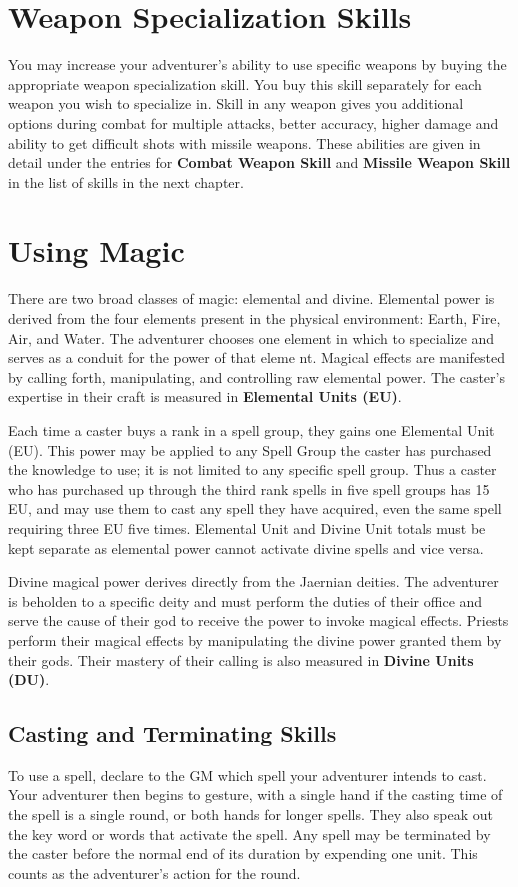 \setlength{\columnsep}{\defcolwidth}
\begin{multicols*}{2}
\section{Weapon Specialization Skills}
You may increase your adventurer’s ability to use
specific weapons by buying the appropriate weapon specialization skill. You buy this skill separately for each weapon you wish to specialize in. Skill in any weapon gives you additional options during combat for multiple attacks, better accuracy, higher damage and ability to get difficult shots with missile weapons. These abilities are given in detail under the entries for \textbf{Combat Weapon Skill} and \textbf{Missile
Weapon Skill} in the list of skills in the next chapter.
\section{Using Magic}
There are two broad classes of magic: elemental
and divine. Elemental power is derived from the four elements present in the physical environment: Earth, Fire, Air, and Water. The adventurer chooses one element in which to specialize and serves as a conduit for the power of that eleme nt. Magical effects are manifested by calling forth, manipulating, and controlling raw elemental power. The caster’s expertise in their craft is measured in \textbf{Elemental Units (EU)}.

Each time a caster buys a rank in a spell group, they gains one Elemental Unit (EU). This power may be applied to any Spell Group the caster has purchased the knowledge to use; it is not limited to any specific spell group. Thus a caster who has purchased up through the third rank spells in five spell groups has 15 EU, and may use them to cast any spell they have acquired, even the same spell requiring three EU five times. Elemental Unit and Divine Unit totals must be kept separate as elemental power cannot activate divine spells and vice versa.

Divine magical power derives directly from the Jaernian deities. The adventurer is beholden to a specific deity and must perform the duties of their office and serve the cause of their god to receive the power to invoke magical effects. Priests perform their magical effects by manipulating the divine power granted them by their gods. Their mastery of their calling is also measured in \textbf{Divine Units (DU)}.
\subsection{Casting and Terminating Skills}
To use a spell, declare to the GM which spell your adventurer intends to cast. Your adventurer then begins to gesture, with a single hand if the casting time of the spell is a single round, or both hands for longer spells. They also speak out the key word or words that activate the spell. Any spell may be terminated by the caster before
the normal end of its duration by expending one unit. This counts as the adventurer’s action for the round.

\end{multicols*}
